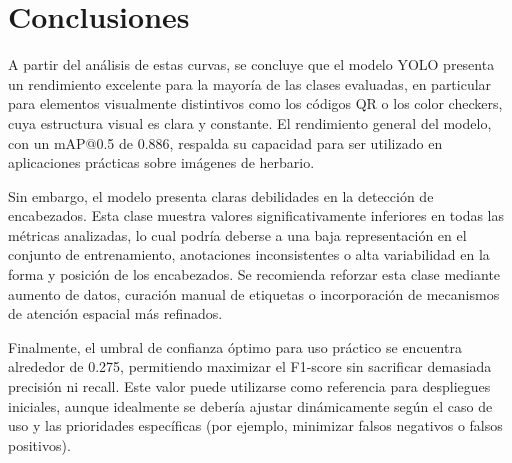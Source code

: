 \chapter{Conclusiones}

A partir del análisis de estas curvas, se concluye que el modelo YOLO presenta un rendimiento excelente para la mayoría de las clases evaluadas, en particular para elementos visualmente distintivos como los códigos QR o los color checkers, cuya estructura visual es clara y constante. El rendimiento general del modelo, con un mAP@0.5 de 0.886, respalda su capacidad para ser utilizado en aplicaciones prácticas sobre imágenes de herbario.

Sin embargo, el modelo presenta claras debilidades en la detección de encabezados. Esta clase muestra valores significativamente inferiores en todas las métricas analizadas, lo cual podría deberse a una baja representación en el conjunto de entrenamiento, anotaciones inconsistentes o alta variabilidad en la forma y posición de los encabezados. Se recomienda reforzar esta clase mediante aumento de datos, curación manual de etiquetas o incorporación de mecanismos de atención espacial más refinados.

Finalmente, el umbral de confianza óptimo para uso práctico se encuentra alrededor de 0.275, permitiendo maximizar el F1-score sin sacrificar demasiada precisión ni recall. Este valor puede utilizarse como referencia para despliegues iniciales, aunque idealmente se debería ajustar dinámicamente según el caso de uso y las prioridades específicas (por ejemplo, minimizar falsos negativos o falsos positivos).